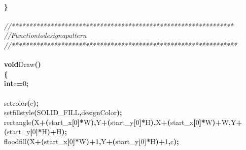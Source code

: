 \documentclass[a4paper, 10pt]{article}
\newcommand\SPC{\hspace*{0.6em}}
\newcommand{\CppAComment}[1]{\textit{\textcolor[rgb]{0.2,0.6,1}{#1}}}
\newcommand{\CppAIdentifier}[1]{#1}
\newcommand{\CppANumber}[1]{\textcolor[rgb]{0.5,0,0.5}{#1}}
\newcommand{\CppAReservedWord}[1]{\textbf{#1}}
\newcommand{\CppASpace}[1]{\colorbox[rgb]{1,1,1}{#1}}
\newcommand{\CppASymbol}[1]{\textbf{\textcolor[rgb]{1,0,0}{#1}}}
\begin{document}
\begin{ttfamily}
\\
\CppASymbol{\}}\\
\\
\CppAComment{//***************************************************************}\\
\CppAComment{//\SPC \SPC \SPC \SPC \SPC \SPC \SPC \SPC \SPC Function\SPC to\SPC design\SPC a\SPC pattern}\\
\CppAComment{//****************************************************************}\\
\\
\CppAReservedWord{void}\CppASpace{\SPC }\CppAIdentifier{Draw}\CppASymbol{(}\CppASymbol{)}\\
\CppASymbol{\{}\\
\CppASpace{\SPC }\CppAReservedWord{int}\CppASpace{\SPC }\CppAIdentifier{c}\CppASymbol{=}\CppANumber{0}\CppASymbol{;}\\
\\
\CppASpace{\SPC }\CppAIdentifier{setcolor}\CppASymbol{(}\CppAIdentifier{c}\CppASymbol{)}\CppASymbol{;}\\
\CppASpace{\SPC }\CppAIdentifier{setfillstyle}\CppASymbol{(}\CppAIdentifier{SOLID\_FILL}\CppASymbol{,}\CppAIdentifier{designColor}\CppASymbol{)}\CppASymbol{;}\\
\CppASpace{\SPC }\CppAIdentifier{rectangle}\CppASymbol{(}\CppAIdentifier{X}\CppASymbol{+}\CppASymbol{(}\CppAIdentifier{start\_x}\CppASymbol{[}\CppANumber{0}\CppASymbol{]}\CppASymbol{*}\CppAIdentifier{W}\CppASymbol{)}\CppASymbol{,}\CppAIdentifier{Y}\CppASymbol{+}\CppASymbol{(}\CppAIdentifier{start\_y}\CppASymbol{[}\CppANumber{0}\CppASymbol{]}\CppASymbol{*}\CppAIdentifier{H}\CppASymbol{)}\CppASymbol{,}\CppAIdentifier{X}\CppASymbol{+}\CppASymbol{(}\CppAIdentifier{start\_x}\CppASymbol{[}\CppANumber{0}\CppASymbol{]}\CppASymbol{*}\CppAIdentifier{W}\CppASymbol{)}\CppASymbol{+}\CppAIdentifier{W}\CppASymbol{,}\CppAIdentifier{Y}\CppASymbol{+}\CppASymbol{(}\CppAIdentifier{start\_y}\CppASymbol{[}\CppANumber{0}\CppASymbol{]}\CppASymbol{*}\CppAIdentifier{H}\CppASymbol{)}\CppASymbol{+}\CppAIdentifier{H}\CppASymbol{)}\CppASymbol{;}\\
\CppASpace{\SPC }\CppAIdentifier{floodfill}\CppASymbol{(}\CppAIdentifier{X}\CppASymbol{+}\CppASymbol{(}\CppAIdentifier{start\_x}\CppASymbol{[}\CppANumber{0}\CppASymbol{]}\CppASymbol{*}\CppAIdentifier{W}\CppASymbol{)}\CppASymbol{+}\CppANumber{1}\CppASymbol{,}\CppAIdentifier{Y}\CppASymbol{+}\CppASymbol{(}\CppAIdentifier{start\_y}\CppASymbol{[}\CppANumber{0}\CppASymbol{]}\CppASymbol{*}\CppAIdentifier{H}\CppASymbol{)}\CppASymbol{+}\CppANumber{1}\CppASymbol{,}\CppAIdentifier{c}\CppASymbol{)}\CppASymbol{;}\\

\end{ttfamily}
\end{document}
